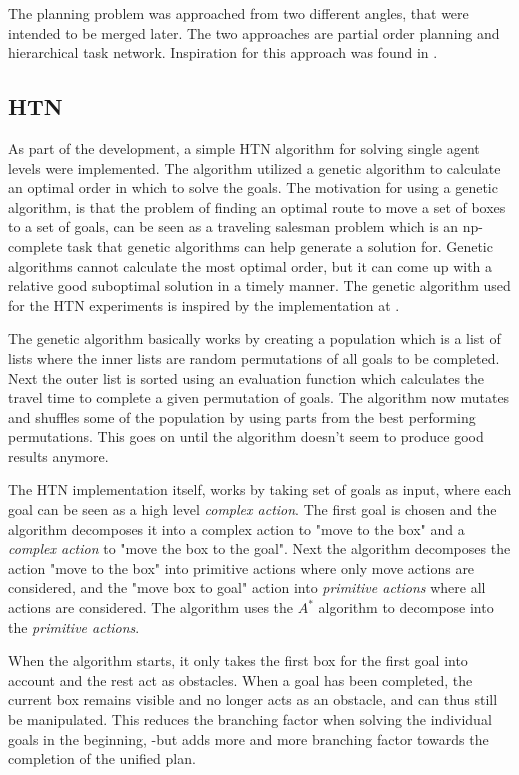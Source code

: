 \documentclass[Main]{subfiles}
\begin{document}
\FloatBarrier

The planning problem was approached from two different angles, that were intended to be merged later. The two approaches are partial order planning and hierarchical task network. Inspiration for this approach was found in \cite{pellier2007unified}. 


\subsection{HTN}
As part of the development, a simple HTN algorithm for solving single agent levels were implemented.
The algorithm utilized a genetic algorithm to calculate an optimal order in which to solve the goals.
The motivation for using a genetic algorithm, is that the problem of finding an optimal route to move a set of boxes to a set of goals, can be seen as a traveling salesman problem which is an np-complete task that genetic algorithms can help generate a solution for.
Genetic algorithms cannot calculate the most optimal order, but it can come up with a relative good suboptimal solution in a timely manner. The genetic algorithm used for the HTN experiments is inspired by the implementation at \cite{genetic}.

The genetic algorithm basically works by creating a population which is a list of lists where the inner lists are random permutations of all goals to be completed.
Next the outer list is sorted using an evaluation function which calculates the travel time to complete a given permutation of goals.
The algorithm now mutates and shuffles some of the population by using parts from the best performing permutations.
This goes on until the algorithm doesn't seem to produce good results anymore.

The HTN implementation itself, works by taking set of goals as input, where each goal can be seen as a high level \textit{complex action}. The first goal is chosen and the algorithm decomposes it into a complex action to "move to the box" and a \textit{complex action} to "move the box to the goal". Next the algorithm decomposes the action "move to the box" into primitive actions where only move actions are considered, and the "move box to goal" action into \textit{primitive actions} where all actions are considered.
The algorithm uses the $A^*$ algorithm to decompose into the \textit{primitive actions}.

When the algorithm starts, it only takes the first box for the first goal into account and the rest act as obstacles. When a goal has been completed, the current box remains visible and no longer acts as an obstacle, and can thus still be manipulated. This reduces the branching factor when solving the individual goals in the beginning, -but adds more and more branching factor towards the completion of the unified plan.
\end{document}
